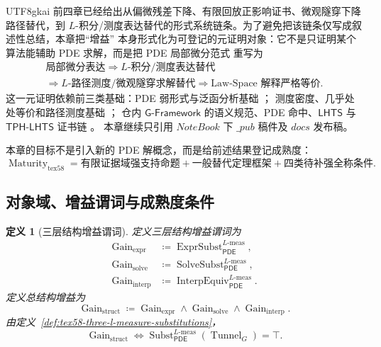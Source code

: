 \documentclass[12pt]{article}
\newtheorem{definition}{定义}[section]
\newcommand{\GFramework}{\textsf{G-Framework}}
\newcommand{\DefEq}{\coloneqq}
\newcommand{\LHTS}{\ensuremath{\mathsf{LHTS}}}
\newcommand{\TPHLHTS}{\ensuremath{\mathsf{TPH\mbox{-}LHTS}}}
\newcommand{\PDE}{\ensuremath{\mathsf{PDE}}}
\DeclareMathOperator{\Gain}{Gain}
\DeclareMathOperator{\Tunnel}{Tunnel}
\DeclareMathOperator{\Subst}{Subst}
\DeclareMathOperator{\ExprSubst}{ExprSubst}
\DeclareMathOperator{\SolveSubst}{SolveSubst}
\DeclareMathOperator{\InterpEquiv}{InterpEquiv}
\DeclareMathOperator{\Maturity}{Maturity}
\newcommand{\Lmeas}{L\text{-}\mathrm{meas}}
\begin{document}
\begin{CJK*}{UTF8}{gkai}
前四章已经给出从偏微残差下降、有限回放正影响证书、微观隧穿下降路径替代，到
\(L\)-积分/测度表达替代的形式系统链条。为了避免把该链条仅写成叙述性总结，本章把“增益”
本身形式化为可登记的元证明对象：它不是只证明某个算法能辅助 PDE 求解，而是把 PDE 局部微分范式
重写为
\[
  \boxed{
  \begin{gathered}
  \text{局部微分表达}
  \Rightarrow
  L\text{-积分/测度表达替代}\\
  \Rightarrow
  L\text{-路径测度/微观隧穿求解替代}
  \Rightarrow
  \text{Law-Space 解释严格等价}.
  \end{gathered}
  }
\]
这一元证明依赖前三类基础：PDE 弱形式与泛函分析基础
\cite{Evans2010PDE,BrennerScott2008FEM,Brezis2011FunctionalAnalysis}；
测度密度、几乎处处等价和路径测度基础
\cite{Bogachev2007MeasureTheory,AmbrosioGigliSavare2008GradientFlows}；
仓内 \(\GFramework{}\) 的语义规范、PDE 命中、\LHTS{} 与 \TPHLHTS{} 证书链
\cite{RepoTex37SemanticGauge,RepoTex55PDEParadigm,RepoTex56LHTS,RepoTex57TPHLHTS}。
本章继续只引用 \(NoteBook\) 下 \(\_pub\) 稿件及 \(docs\) 发布稿。

本章的目标不是引入新的 PDE 解概念，而是给前述结果登记成熟度：
\[
  \boxed{
  \Maturity_{\mathrm{tex58}}
  =
  \text{有限证据域强支持命题}
  +
  \text{一般替代定理框架}
  +
  \text{四类待补强全称条件}.
  }
\]

\subsection{对象域、增益谓词与成熟度条件}
\label{subsec:tex58-gain-maturity-definitions}

\begin{definition}[三层结构增益谓词]
\label{def:tex58-three-layer-gain}
定义三层结构增益谓词为
\[
\begin{aligned}
  \Gain_{\mathrm{expr}}
  &\DefEq
  \ExprSubst_{\PDE}^{\Lmeas},\\
  \Gain_{\mathrm{solve}}
  &\DefEq
  \SolveSubst_{\PDE}^{\Lmeas},\\
  \Gain_{\mathrm{interp}}
  &\DefEq
  \InterpEquiv_{\PDE}^{\Lmeas}.
\end{aligned}
\]
定义总结构增益为
\[
  \Gain_{\mathrm{struct}}
  \DefEq
  \Gain_{\mathrm{expr}}
  \wedge
  \Gain_{\mathrm{solve}}
  \wedge
  \Gain_{\mathrm{interp}}.
\]
由定义~\ref{def:tex58-three-l-measure-substitutions}，
\[
  \Gain_{\mathrm{struct}}
  \Longleftrightarrow
  \Subst_{\PDE}^{\Lmeas}(\Tunnel_G)=\top.
\]
\end{definition}


\end{CJK*}
\end{document}
